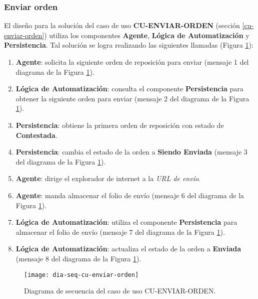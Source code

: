 \subsubsection{Enviar orden}
El diseño para la solución del caso de uso \textbf{CU-ENVIAR-ORDEN} (sección \ref{cu-enviar-orden}) utiliza los componentes \textbf{Agente}, \textbf{Lógica de Automatización} y \textbf{Persistencia}. Tal solución se logra realizando las siguientes llamadas (Figura \ref{fig:dia-seq-cu-enviar-orden}):
\begin{enumerate}
	\item \textbf{Agente}: solicita la siguiente orden de reposición para enviar (mensaje 1 del diagrama de la Figura \ref{fig:dia-seq-cu-enviar-orden}).
	\item \textbf{Lógica de Automatización}: consulta el componente \textbf{Persistencia} para obtener la siguiente orden para enviar (mensaje 2 del diagrama de la Figura \ref{fig:dia-seq-cu-enviar-orden}).
	\item \textbf{Persistencia}: obtiene la primera orden de reposición con estado de \textbf{Contestada}.
	\item \textbf{Persistencia}: cambia el estado de la orden a \textbf{Siendo Enviada} (mensaje 3 del diagrama de la Figura \ref{fig:dia-seq-cu-enviar-orden}).
	\item \textbf{Agente}: dirige el explorador de internet a la \textit{URL de envío}.
	\item \textbf{Agente}: manda almacenar el folio de envío (mensaje 6 del diagrama de la Figura \ref{fig:dia-seq-cu-enviar-orden}).
	\item \textbf{Lógica de Automatización}: utiliza el componente \textbf{Persistencia} para almacenar el folio de envío (mensaje 7 del diagrama de la Figura \ref{fig:dia-seq-cu-enviar-orden}).
	\item \textbf{Lógica de Automatización}: actualiza el estado de la orden a \textbf{Enviada} (mensaje 8 del diagrama de la Figura \ref{fig:dia-seq-cu-enviar-orden}).
\end{enumerate}

\begin{figure}[h]
	\centering
	\texttt{[image: dia-seq-cu-enviar-orden]}
	\caption{Diagrama de secuencia del caso de uso CU-ENVIAR-ORDEN.}
	\label{fig:dia-seq-cu-enviar-orden}
\end{figure}

